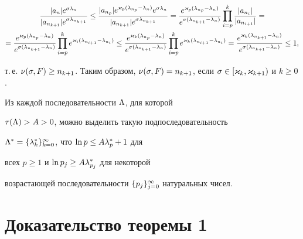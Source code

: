 \begin{pf}
\begin{gather*}
\frac{|a_n|e^{\s\l_n}}{|a_{n_{k+1}}|e^{\s\l_{n_{k+1}}}}\le


\frac{|a_{n_p}|e^{\k_p(\l_{n_p}-\l_n)}


e^{\s\l_n}}{|a_{n_{k+1}}|e^{\s\l_{n_{k+1}}}}=


\frac{e^{\k_p(\l_{n_p}-\l_n)}}{e^{\s(\l_{n_{k+1}}-\l_n)}}


\prod_{i=p}^{k}\frac{|a_{n_i}|}{|a_{n_{i+1}}|}=\\


=\frac{e^{\k_p(\l_{n_p}-\l_n)}}{e^{\s(\l_{n_{k+1}}-\l_n)}}


\prod_{i=p}^{k}e^{\k_i(\l_{n_{i+1}}-\l_{n_i})}\le


\frac{e^{\k_k(\l_{n_p}-\l_n)}}{e^{\s(\l_{n_{k+1}}-\l_n)}}


\prod_{i=p}^{k}e^{\k_k(\l_{n_{i+1}}-\l_{n_i})}=


\frac{e^{\k_k(\l_{n_{k+1}}-\l_n)}}{e^{\s(\l_{n_{k+1}}-\l_n)}}\le1,


\end{gather*}


т.\,е. $\nu(\s,F)\ge n_{k+1}$. Таким образом, $\nu(\s,F)=


n_{k+1}$, если $\s\in[\k_k,\k_{k+1})$ и $k\ge 0$.


\end{pf}





\begin{lem}


Из каждой последовательности $\Lambda$, для которой


$\tau(\Lambda)>A>0$, можно выделить такую подпоследовательность


$\Lambda^*=\{\lambda^*_k\}_{k=0}^\infty$, что $\ln p\le A\lambda^*_p+1$ для


всех $p\ge 1$ и $\ln p_j\ge A\lambda^*_{p_j}$ для некоторой


возрастающей последовательности $\{p_j\}_{j=0}^\infty$ натуральных чисел.


\end{lem}








\section{Доказательство теоремы 1}





